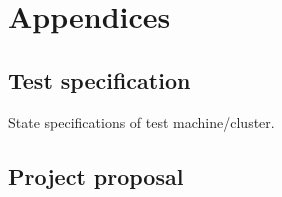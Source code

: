 \documentclass[12pt,a4paper,twoside,notitlepage]{report}
\theoremstyle{definition}
\begin{document}
\cleardoublepage


\cleardoublepage


\cleardoublepage

\printbibliography[heading=bibintoc]


\appendix
\chapter{Appendices}

\section{Test specification}
State specifications of test machine/cluster.
\clearpage

\clearpage
\section{Project proposal} \label{sec:proposal}

\end{document}

